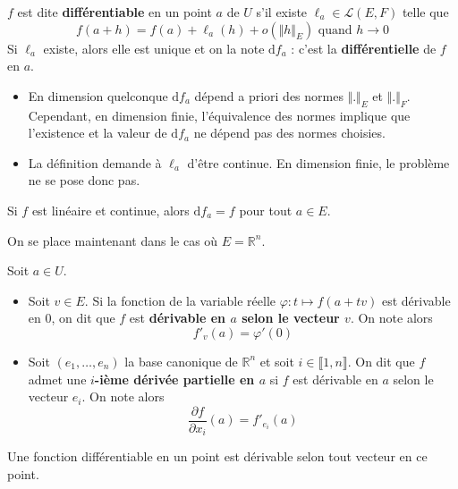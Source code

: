 	\begin{definition}
		$f$ est dite \textbf{différentiable} en un point $a$ de $U$ s'il existe $\ell_a \in \mathcal{L}(E,F)$ telle que
		\[ f(a+h) = f(a) + \ell_a(h) + o(\Vert h \Vert_E) \text{ quand } h \longrightarrow 0 \]
		Si $\ell_a$ existe, alors elle est unique et on la note $\mathrm{d}f_a$ : c'est la \textbf{différentielle} de $f$ en $a$.
	\end{definition}
	
	\begin{remark}
		\begin{itemize}
			\item En dimension quelconque $\mathrm{d}f_a$ dépend a priori des normes $\Vert . \Vert_E$ et $\Vert . \Vert_F$. Cependant, en dimension finie, l'équivalence des normes implique que l'existence et la valeur de $\mathrm{d}f_a$ ne dépend pas des normes choisies.
			\item La définition demande à $\ell_a$ d'être continue. En dimension finie, le problème ne se pose donc pas.
		\end{itemize}
	\end{remark}
	
	\begin{example}
		Si $f$ est linéaire et continue, alors $\mathrm{d}f_a = f$ pour tout $a \in E$.
	\end{example}
	
	On se place maintenant dans le cas où $E = \mathbb{R}^n$.
	
	\begin{definition}
		Soit $a \in U$.
		\begin{itemize}
			\item Soit $v \in E$. Si la fonction de la variable réelle $\varphi : t \mapsto f(a+tv)$ est dérivable en $0$, on dit que $f$ est \textbf{dérivable en $a$ selon le vecteur $v$}. On note alors
			\[ f'_v(a) = \varphi'(0) \]
			\item Soit $(e_1, \dots, e_n)$ la base canonique de $\mathbb{R}^n$ et soit $i \in \llbracket 1, n \rrbracket$. On dit que $f$ admet une \textbf{$i$-ième dérivée partielle en $a$} si $f$ est dérivable en $a$ selon le vecteur $e_i$. On note alors
			\[ \frac{\partial f}{\partial x_i}(a) = f'_{e_i}(a) \]
		\end{itemize}
	\end{definition}
	
	\begin{proposition}
		Une fonction différentiable en un point est dérivable selon tout vecteur en ce point.
	\end{proposition}
	
